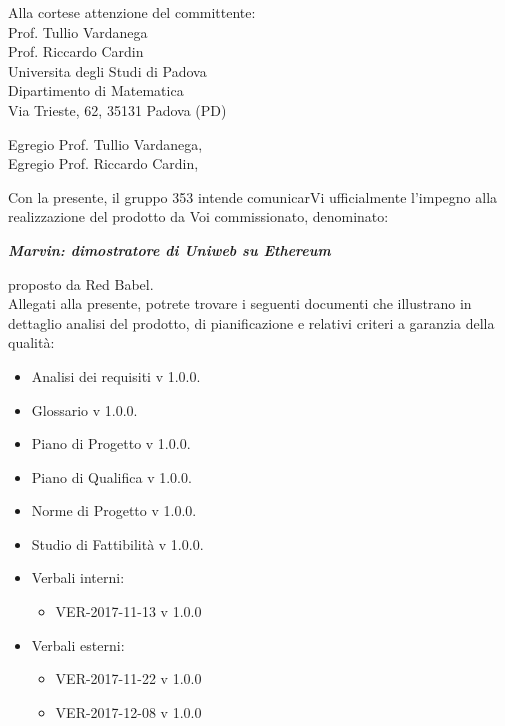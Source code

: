 \documentclass[openany, a4paper, 12pt]{letter}
\begin{document}
	
	\begin{letter}{
			Alla cortese attenzione del committente:\\
			\smallskip
			Prof. Tullio Vardanega\\
			Prof. Riccardo Cardin\\
			\medskip
			Universita degli Studi di Padova \\
			Dipartimento di Matematica\\
			Via Trieste, 62, 35131 Padova (PD)}
			\opening{Egregio Prof. Tullio Vardanega, \\
				Egregio Prof. Riccardo Cardin,}
			Con la presente, il gruppo 353 intende comunicarVi ufficialmente l’impegno alla realizzazione del
			prodotto da Voi commissionato, denominato: \\
			\begin{center}
			\emph{\textbf{Marvin: dimostratore di Uniweb su Ethereum}}\medskip \\
			\end{center}
			proposto da Red Babel.\medskip\\
			Allegati alla presente, potrete trovare i seguenti documenti che illustrano in dettaglio analisi del
			prodotto, di pianificazione e relativi criteri a garanzia della qualità: 
			\begin{itemize}
				\item Analisi dei requisiti v 1.0.0.
				\item Glossario v 1.0.0.
				\item Piano di Progetto v 1.0.0.
				\item Piano di Qualifica v 1.0.0.
				\item Norme di Progetto v 1.0.0.
				\item Studio di Fattibilità v 1.0.0.
				\item Verbali interni:
					\begin{itemize}
						\item VER-2017-11-13 v 1.0.0
					\end{itemize}
				\item Verbali esterni:
					\begin{itemize}
						\item VER-2017-11-22 v 1.0.0
						\item VER-2017-12-08 v 1.0.0
					\end{itemize}				
				\end{itemize}
			
			\thispagestyle{firstpage}


\end{letter}
\end{document}
